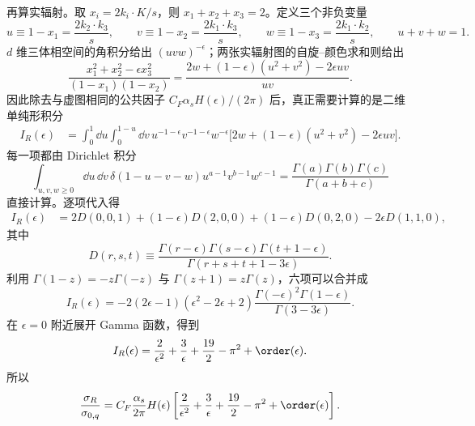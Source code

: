 \begin{derivation}[强子产生率中的实虚抵消]
再算实辐射。取 $x_i=2k_i\!\cdot K/s$，则 $x_1+x_2+x_3=2$。定义三个非负变量
\begin{equation*}
 u\equiv1-x_1=\frac{2k_2\!\cdot k_3}{s},\qquad
 v\equiv1-x_2=\frac{2k_1\!\cdot k_3}{s},\qquad
 w\equiv1-x_3=\frac{2k_1\!\cdot k_2}{s},
 \qquad u+v+w=1.
\end{equation*}
$d$ 维三体相空间的角积分给出 $(uvw)^{-\epsilon}$；两张实辐射图的自旋--颜色求和则给出
\begin{equation*}
 \frac{x_1^2+x_2^2-\epsilon x_3^2}{(1-x_1)(1-x_2)}
 =\frac{2w+(1-\epsilon)(u^2+v^2)-2\epsilon uv}{uv}.
\end{equation*}
因此除去与虚图相同的公共因子 $C_F\alpha_sH(\epsilon)/(2\pi)$ 后，真正需要计算的是二维单纯形积分
\begin{align*}
 I_R(\epsilon)
 &=\int_0^1\dd u\int_0^{1-u}\dd v\,
 u^{-1-\epsilon}v^{-1-\epsilon}w^{-\epsilon}
 \bigl[2w+(1-\epsilon)(u^2+v^2)-2\epsilon uv\bigr].
\end{align*}
每一项都由 Dirichlet 积分
\begin{equation*}
 \int_{u,v,w\ge0}\dd u\,\dd v\,
 \delta(1-u-v-w)u^{a-1}v^{b-1}w^{c-1}
 =\frac{\Gamma(a)\Gamma(b)\Gamma(c)}{\Gamma(a+b+c)}
\end{equation*}
直接计算。逐项代入得
\begin{align*}
 I_R(\epsilon)
 &=2D(0,0,1)+(1-\epsilon)D(2,0,0)
 +(1-\epsilon)D(0,2,0)-2\epsilon D(1,1,0),
\end{align*}
其中
\begin{equation*}
 D(r,s,t)
 \equiv
 \frac{\Gamma(r-\epsilon)\Gamma(s-\epsilon)\Gamma(t+1-\epsilon)}
 {\Gamma(r+s+t+1-3\epsilon)}.
\end{equation*}
利用 $\Gamma(1-z)=-z\Gamma(-z)$ 与 $\Gamma(z+1)=z\Gamma(z)$，六项可以合并成
\begin{equation*}
 I_R(\epsilon)
 =-2(2\epsilon-1)(\epsilon^2-2\epsilon+2)
 \frac{\Gamma(-\epsilon)^2\Gamma(1-\epsilon)}
 {\Gamma(3-3\epsilon)}.
\end{equation*}
在 $\epsilon=0$ 附近展开 Gamma 函数，得到
\begin{equation*}
 I_R(\epsilon)
 =\frac2{\epsilon^2}+\frac3\epsilon
 +\frac{19}{2}-\pi^2+\order(\epsilon).
\end{equation*}
所以
\begin{equation*}
 \frac{\sigma_R}{\sigma_{0,q}}
 =C_F\frac{\alpha_s}{2\pi}H(\epsilon)
 \left[\frac2{\epsilon^2}+\frac3\epsilon
 +\frac{19}{2}-\pi^2+\order(\epsilon)\right].
\end{equation*}


\end{derivation}
